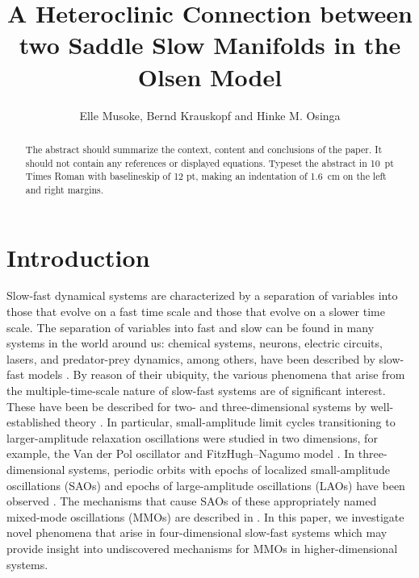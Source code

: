 \documentclass{ws-ijbc}
\begin{document}
\catchline{}{}{}{}{} %


\title{A Heteroclinic Connection between two Saddle Slow Manifolds in the Olsen Model}

\author{Elle Musoke, Bernd Krauskopf and Hinke M. Osinga}

\address{Department of Mathematics, University of Auckland, Private Bag 92019\\
Auckland, 1142, New Zealand\\
elle.musoke@auckland.ac.nz}

\maketitle

\begin{history}
\end{history}

\begin{abstract}
The abstract should summarize the context, content and conclusions
of the paper. It should not contain any references or displayed
equations. Typeset the abstract in 10~pt Times Roman with
baselineskip of 12 pt, making an indentation of 1.6~cm on the left
and right margins.
\end{abstract}

\section{Introduction}
Slow-fast dynamical systems are characterized by a separation of variables into those that evolve on a fast time scale and those that evolve on a slower time scale.  The separation of variables into fast and slow can be found in many systems in the world around us: chemical systems, neurons, electric circuits, lasers, and predator-prey dynamics, among others, have been described by slow-fast models  \cite{BZ_reaction, Neurons,Circuits, lasers, Predator-Prey}.  By reason of their ubiquity, the various phenomena that arise from the multiple-time-scale nature of slow-fast systems are of significant interest. These have been be described for two- and three-dimensional systems by well-established theory \cite{canard_explosion, lents-rapides, enlacement,singular_hopf, folded_node,three}.  In particular, small-amplitude limit cycles transitioning to larger-amplitude relaxation oscillations were studied in two dimensions, for example, the Van der Pol oscillator and FitzHugh--Nagumo model \cite{canard_explosion, fitz-hugh-nagumo}.  In three-dimensional systems, periodic orbits with epochs of localized small-amplitude oscillations (SAOs) and epochs of large-amplitude oscillations (LAOs) have been observed \cite{BZ}.  The mechanisms that cause SAOs of these appropriately named mixed-mode oscillations (MMOs) are described in \cite{MMO}.  In this paper, we investigate novel phenomena that arise in four-dimensional slow-fast systems which may provide insight into undiscovered mechanisms for MMOs in higher-dimensional systems.
\end{document}
